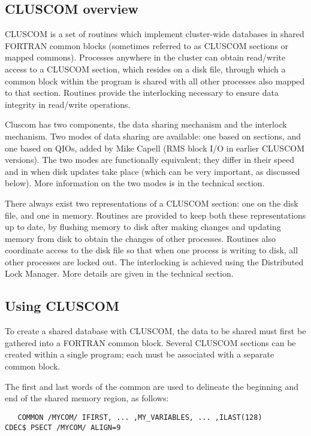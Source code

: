 \subsection{CLUSCOM overview}
CLUSCOM is a set of routines which implement cluster-wide databases
in shared FORTRAN common blocks (sometimes referred to as CLUSCOM
sections or mapped commons).
Processes anywhere in the cluster
can obtain read/write access to a CLUSCOM section, which resides on
a disk file, through which a common block
within the program is shared with all other processes also mapped to
that section. Routines provide the interlocking necessary to ensure
data integrity in read/write operations.

Cluscom has two components, the data sharing mechanism and the interlock
mechanism. Two modes of data sharing are available: one based on 
sections, and one based on QIOs, added by Mike Capell
(RMS block I/O in earlier CLUSCOM versions). The two modes are
functionally equivalent; they differ in their speed and in when disk updates
take place (which can be very important, as discussed below).
More information on the two modes is in the technical section.

There always exist two representations of a CLUSCOM section: one on the
disk file, and one in memory. Routines are provided to keep both these
representations up to date, by flushing memory to disk after making
changes and updating memory from disk to obtain the changes of
other processes. Routines also coordinate access to the disk file so that
when one process is writing to disk, all other processes are locked out.
The interlocking is achieved using the Distributed Lock Manager. More
details are given in the technical section.

\subsection{Using CLUSCOM}

To create a shared database with CLUSCOM, the data to be shared must
first be gathered into a FORTRAN common block. Several CLUSCOM sections
can be created within a single program; each must be associated with
a separate common block. 

 The first and last words of the common are
used to delineate the beginning and end of the shared memory region,
as follows:

\begin{verbatim}
   COMMON /MYCOM/ IFIRST, ... ,MY_VARIABLES, ... ,ILAST(128)
CDEC$ PSECT /MYCOM/ ALIGN=9
\end{verbatim}

